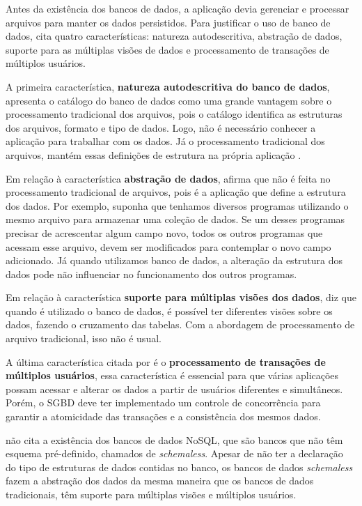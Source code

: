 Antes da existência dos bancos de dados, a aplicação devia gerenciar e processar arquivos para manter os dados persistidos. Para justificar o uso de banco de dados,  cita quatro características: natureza autodescritiva, abstração de dados, suporte para as múltiplas visões de dados e processamento de transações de múltiplos usuários.

A primeira característica, \textbf{natureza autodescritiva do banco de dados}, apresenta o catálogo do banco de dados como uma grande vantagem sobre o processamento tradicional dos arquivos, pois o catálogo identifica as estruturas dos arquivos, formato e tipo de dados. Logo, não é necessário conhecer a aplicação para trabalhar com os dados. Já  o processamento tradicional dos arquivos, mantém essas definições de estrutura na própria aplicação \cite{Elmasri}.

Em relação à característica \textbf{abstração de dados},  afirma que não é feita no processamento tradicional de arquivos, pois é a aplicação que define a estrutura dos dados. Por exemplo, suponha que tenhamos diversos programas utilizando o mesmo arquivo para armazenar uma coleção de dados. Se um desses programas precisar de acrescentar algum campo novo, todos os outros programas que acessam esse arquivo, devem ser modificados para contemplar o novo campo adicionado. Já quando utilizamos banco de dados, a alteração da estrutura dos dados pode não influenciar no funcionamento dos outros programas.

Em relação à característica \textbf{suporte para múltiplas visões dos dados},  diz que quando é utilizado o banco de dados, é possível ter diferentes visões sobre os dados, fazendo o cruzamento das tabelas. Com a abordagem de processamento de arquivo tradicional, isso não é usual.

A última característica citada por  é o \textbf{processamento de transações de múltiplos usuários}, essa característica é essencial para que várias aplicações possam acessar e alterar os dados a partir de usuários diferentes e simultâneos. Porém, o \ac{SGBD} deve ter implementado um controle de concorrência para garantir a atomicidade das transações e a consistência dos mesmos dados.

 não cita a existência dos bancos de dados NoSQL, que são bancos que não têm esquema pré-definido, chamados de \textit{schemaless}. Apesar de não ter a declaração do tipo de estruturas de dados contidas no banco, os bancos de dados \textit{schemaless} fazem a abstração dos dados da mesma maneira que os bancos de dados tradicionais, têm suporte para múltiplas visões e múltiplos usuários.

